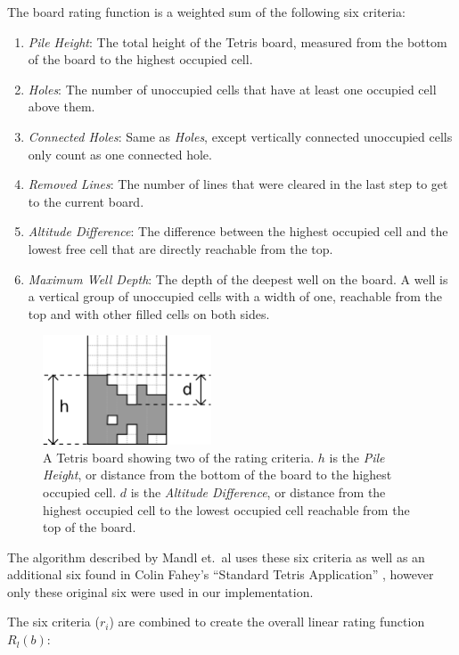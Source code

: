 \documentclass[a4paper,12pt]{article}
\begin{document}
The board rating function is a weighted sum of the following six criteria:

\begin{enumerate}
  \item \emph{Pile Height}: The total height of the Tetris board, measured from
      the bottom of the board to the highest occupied cell.
  \item \emph{Holes}: The number of unoccupied cells that have at least one
      occupied cell above them.
  \item \emph{Connected Holes}: Same as \emph{Holes}, except vertically
      connected unoccupied cells only count as one connected hole.
  \item \emph{Removed Lines}: The number of lines that were cleared in the last
      step to get to the current board.
  \item \emph{Altitude Difference}: The difference between the highest occupied
      cell and the lowest free cell that are directly reachable from the top.
  \item \emph{Maximum Well Depth}: The depth of the deepest well on the board.
      A well is a vertical group of unoccupied cells with a width of one,
      reachable from the top and with other filled cells on both sides.
\end{enumerate}

\begin{figure}[hb]
  \centering
  \includegraphics[width=5cm]{boards1.png}
  \caption{A Tetris board showing two of the rating criteria.  $h$ is
      the \emph{Pile Height}, or distance from the bottom of the board to
      the highest occupied cell.  $d$ is the \emph{Altitude Difference}, or
      distance from the highest occupied cell to the lowest occupied cell
      reachable from the top of the board.}
  \label{BoardRating}
\end{figure}

The algorithm described by Mandl et.\ al uses these six criteria as well as
an additional six found in Colin Fahey's ``Standard Tetris Application''
\cite{TetrisAI}, however only these original six were used in our
implementation.

The six criteria ($r_i$) are combined to create the overall linear rating
function $R_l(b)$:
\end{document}
